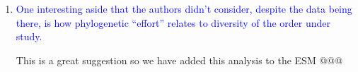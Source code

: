 \documentclass[12pt,letterpaper]{article}
\begin{document}
\begin{enumerate}

\item{\textcolor{blue}{One interesting aside that the authors didn't consider, despite the data being there, is how phylogenetic ``effort'' relates to diversity of the order under study.}}

This is a great suggestion so we have added this analysis to the ESM @@@%

\end{enumerate}

\end{document}
